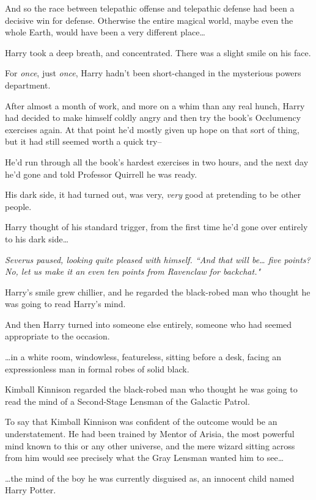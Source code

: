 And so the race between telepathic offense and telepathic defense had been a decisive win for defense. Otherwise the entire magical world, maybe even the whole Earth, would have been a very different place{\ldots}

Harry took a deep breath, and concentrated. There was a slight smile on his face.

For \emph{once}, just \emph{once}, Harry hadn't been short-changed in the mysterious powers department.

After almost a month of work, and more on a whim than any real hunch, Harry had decided to make himself coldly angry and then try the book's Occlumency exercises again. At that point he'd mostly given up hope on that sort of thing, but it had still seemed worth a quick try\---

He'd run through all the book's hardest exercises in two hours, and the next day he'd gone and told Professor Quirrell he was ready.

His dark side, it had turned out, was very, \emph{very} good at pretending to be other people.

Harry thought of his standard trigger, from the first time he'd gone over entirely to his dark side{\ldots}

\emph{Severus paused, looking quite pleased with himself. ``And that will be{\ldots} five points? No, let us make it an even ten points from Ravenclaw for backchat."}

Harry's smile grew chillier, and he regarded the black-robed man who thought he was going to read Harry's mind.

And then Harry turned into someone else entirely, someone who had seemed appropriate to the occasion.

{\ldots}in a white room, windowless, featureless, sitting before a desk, facing an expressionless man in formal robes of solid black.

Kimball Kinnison regarded the black-robed man who thought he was going to read the mind of a Second-Stage Lensman of the Galactic Patrol.

To say that Kimball Kinnison was confident of the outcome would be an understatement. He had been trained by Mentor of Arisia, the most powerful mind known to this or any other universe, and the mere wizard sitting across from him would see precisely what the Gray Lensman wanted him to see{\ldots}

{\ldots}the mind of the boy he was currently disguised as, an innocent child named Harry Potter.

